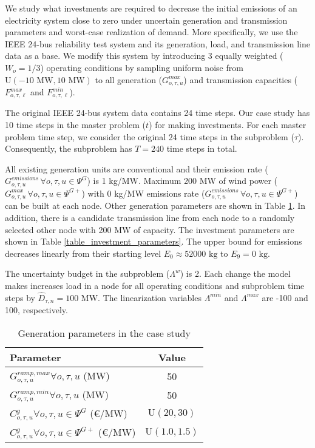 \documentclass[final]{IEEEtran}
\begin{document}
We study what investments are required to decrease the initial emissions of an electricity system close to zero under uncertain generation and transmission parameters and worst-case realization of demand. More specifically, we use the IEEE 24-bus reliability test system and its generation, load, and transmission line data as a base. We modify this system by introducing 3 equally weighted ($W_o = 1/3$) operating conditions by sampling uniform noise from $\textrm{U}(-10 \textrm{ MW}, 10 \textrm{ MW})$ to all generation ($G^{max}_{o, \tau, u}$) and transmission capacities ($F^{max}_{o, \tau, \ell}$ and $F^{min}_{o, \tau, \ell}$).

The original IEEE 24-bus system data contains 24 time steps. Our case study has 10 time steps in the master problem ($t$) for making investments. For each master problem time step, we consider the original 24 time steps in the subproblem ($\tau$). Consequently, the subproblem has $T = 240$ time steps in total.

All existing generation units are conventional and their emission rate ($G^{emissions}_{o, \tau, u} \, \forall o, \tau, u \in \Psi^{G}$) is 1 kg/MW. Maximum 200 MW of wind power ($G^{max}_{o, \tau, u} \, \forall o, \tau, u \in \Psi^{G+}$) with 0 kg/MW emissions rate ($G^{emissions}_{o, \tau, u} \, \forall o, \tau, u \in \Psi^{G+}$) can be built at each node. Other generation parameters are shown in Table \ref{table_generation_parameters}. In addition, there is a candidate transmission line from each node to a randomly selected other node with 200 MW of capacity. The investment parameters are shown in Table \ref{table_investment_parameters}. The upper bound for emissions decreases linearly from their starting level $E_{0} \approx 52000 \textrm{ kg}$ to $E_{9} = 0 \textrm{ kg}$.

The uncertainty budget in the subproblem ($\Lambda^w$) is 2. Each change the model makes increases load in a node for all operating conditions and subproblem time steps by $\hat{D}_{\tau, n} = 100 \textrm{ MW}$. The linearization variables $\Lambda^{min}$ and $\Lambda^{max}$ are -100 and 100, respectively.

\begin{table}[htpb]
\centering
\begin{tabular}{l| c} \hline
Parameter																										& Value 	\\ \hline
$G^{ramp,max}_{o, \tau, u} \forall o, \tau, u$ (MW)					& 50		\\
$G^{ramp,min}_{o, \tau, u} \forall o, \tau, u$ (MW)					& 50		\\
$C^g_{o, \tau, u} \forall o, \tau, u \in \Psi^{G}$ (€/MW)		& $\textrm{U}(20, 30)$ 		\\
$C^g_{o, \tau, u} \forall o, \tau, u \in \Psi^{G+}$ (€/MW)	& $\textrm{U}(1.0, 1.5)$ 		\\
\end{tabular}
\caption{Generation parameters in the case study}
\label{table_generation_parameters}
\end{table}
\end{document}
